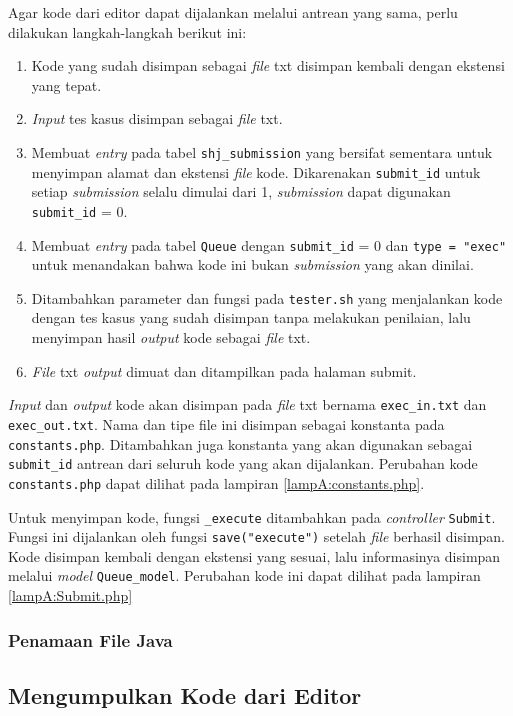 Agar kode dari editor dapat dijalankan melalui antrean yang sama, perlu dilakukan langkah-langkah berikut ini:
\begin{enumerate}
    \item Kode yang sudah disimpan sebagai \textit{file} txt disimpan kembali dengan ekstensi yang tepat.
    \item \textit{Input} tes kasus disimpan sebagai \textit{file} txt.
    \item Membuat \textit{entry} pada tabel \verb|shj_submission| yang bersifat sementara untuk menyimpan alamat dan ekstensi \textit{file} kode. Dikarenakan \verb|submit_id| untuk setiap \textit{submission} selalu dimulai dari 1, \textit{submission} dapat digunakan \verb|submit_id| = 0.
    \item Membuat \textit{entry} pada tabel \verb|Queue| dengan \verb|submit_id| = 0 dan \verb|type = "exec"| untuk menandakan bahwa kode ini bukan \textit{submission} yang akan dinilai.
    \item Ditambahkan parameter dan fungsi pada \verb|tester.sh| yang menjalankan kode dengan tes kasus yang sudah disimpan tanpa melakukan penilaian, lalu menyimpan hasil \textit{output} kode sebagai \textit{file} txt.
    \item \textit{File} txt \textit{output} dimuat dan ditampilkan pada halaman submit.
\end{enumerate}

\textit{Input} dan \textit{output} kode akan disimpan pada \textit{file} txt bernama \verb|exec_in.txt| dan \verb|exec_out.txt|. Nama dan tipe file ini disimpan sebagai konstanta pada \verb|constants.php|. Ditambahkan juga konstanta yang akan digunakan sebagai \verb|submit_id| antrean dari seluruh kode yang akan dijalankan. Perubahan kode \verb|constants.php| dapat dilihat pada lampiran \ref{lampA:constants.php}.

Untuk menyimpan kode, fungsi \verb|_execute| ditambahkan pada \textit{controller} \verb|Submit|. Fungsi ini dijalankan oleh fungsi \verb|save("execute")| setelah \textit{file} berhasil disimpan. Kode disimpan kembali dengan ekstensi yang sesuai, lalu informasinya disimpan melalui \textit{model} \verb|Queue_model|. Perubahan kode ini dapat dilihat pada lampiran \ref{lampA:Submit.php}

\subsubsection{Penamaan File Java}

\subsection{Mengumpulkan Kode dari Editor}
\label{subsec:5:kumpul}

